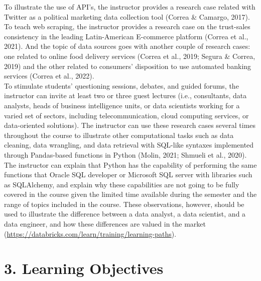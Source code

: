 \documentclass[letterpaper,11pt]{article}
\begin{document}
\vspace{0.3cm}
To illustrate the use of API's, the instructor provides a research case related with Twitter as a political marketing data collection tool (Correa \& Camargo, 2017). To teach web scraping, the instructor provides a research case on the trust-sales consistency in the leading Latin-American E-commerce platform (Correa et al., 2021). And the topic of data sources goes with another couple of research cases: one related to online food delivery services (Correa et al., 2019; Segura \& Correa, 2019) and the other related to consumers' disposition to use automated banking services (Correa et al., 2022). \\
\vspace{0.3cm}
To stimulate students' questioning sessions, debates, and guided forums, the instructor can invite at least two or three guest lectures  (i.e., consultants, data analysts, heads of business intelligence units, or data scientists working for a varied set of sectors, including telecommunication, cloud computing services, or data-oriented solutions). The instructor can use these research cases several times throughout the course to illustrate other computational tasks such as data cleaning, data wrangling, and data retrieval with SQL-like syntaxes implemented through Pandas-based functions in Python (Molin, 2021; Shmueli et al., 2020). The instructor can explain that Python has the capability of performing the same functions that Oracle SQL developer or Microsoft SQL server with libraries such as SQLAlchemy, and explain why these capabilities are not going to be fully covered in the course given the limited time available during the semester and the range of topics included in the course. These observations, however, should be used to illustrate the difference between a data analyst, a data scientist, and a data engineer, and how these differences are valued in the market (\url{https://databricks.com/learn/training/learning-paths}).
\section{3. Learning Objectives}
\end{document}
